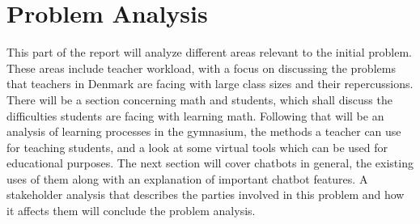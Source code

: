 \chapter{Problem Analysis}\label{ch:problem_analysis}

This part of the report will analyze different areas relevant to the initial problem. These areas include teacher workload, with a focus on discussing the problems that teachers in Denmark are facing with large class sizes and their repercussions. There will be a section concerning math and students, which shall discuss the difficulties students are facing with learning math. Following that will be an analysis of learning processes in the gymnasium, the methods a teacher can use for teaching students, and a look at some virtual tools which can be used for educational purposes. The next section will cover chatbots in general, the existing uses of them along with an explanation of important chatbot features. A stakeholder analysis that describes the parties involved in this problem and how it affects them will conclude the problem analysis.

